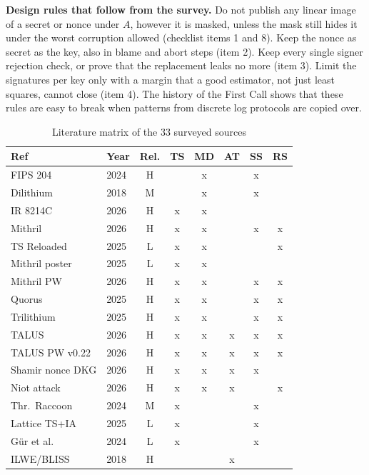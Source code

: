 \documentclass[10pt,conference,a4paper]{IEEEtran}
\begin{document}
\textbf{Design rules that follow from the survey.} Do not publish any linear image of a secret or nonce under $A$, however
it is masked, unless the mask still hides it under the worst corruption allowed (checklist items 1 and 8). Keep the nonce as
secret as the key, also in blame and abort steps (item 2). Keep every single signer rejection check, or prove that the
replacement leaks no more (item 3). Limit the signatures per key only with a margin that a good estimator, not just least
squares, cannot close (item 4). The history of the First Call shows that these rules are easy to break when patterns from
discrete log protocols are copied over.

\begin{table}[t]
\caption{Literature matrix of the 33 surveyed sources}\label{tab:matrix}
\centering\scriptsize
\begin{tabular}{@{}llcccccc@{}}
\toprule
Ref & Year & Rel. & TS & MD & AT & SS & RS\\
\midrule
\cite{fips204} FIPS 204 & 2024 & H &  & x &  & x & \\
\cite{dilithium} Dilithium & 2018 & M &  & x &  & x & \\
\cite{ir8214c} IR 8214C & 2026 & H & x & x &  &  & \\
\cite{mithril} Mithril & 2026 & H & x & x &  & x & x\\
\cite{reloaded} TS Reloaded & 2025 & L & x & x &  &  & x\\
\cite{mithrilposter} Mithril poster & 2025 & L & x & x &  &  & \\
\cite{mithrilpw} Mithril PW & 2026 & H & x & x &  & x & x\\
\cite{quorus} Quorus & 2025 & H & x & x &  & x & x\\
\cite{trilithium} Trilithium & 2025 & H & x & x &  & x & x\\
\cite{talus} TALUS & 2026 & H & x & x & x & x & x\\
\cite{taluspw} TALUS PW v0.22 & 2026 & H & x & x & x & x & x\\
\cite{kao} Shamir nonce DKG & 2026 & H & x & x & x & x & \\
\cite{niot} Niot attack & 2026 & H & x & x & x &  & x\\
\cite{raccoon} Thr.\ Raccoon & 2024 & M & x &  &  & x & \\
\cite{dpia} Lattice TS+IA & 2025 & L & x &  &  & x & \\
\cite{gks} G\"ur et al. & 2024 & L & x &  &  & x & \\
\cite{ilwe} ILWE/BLISS & 2018 & H &  &  & x &  & \\

\end{tabular}
\end{table}
\end{document}
